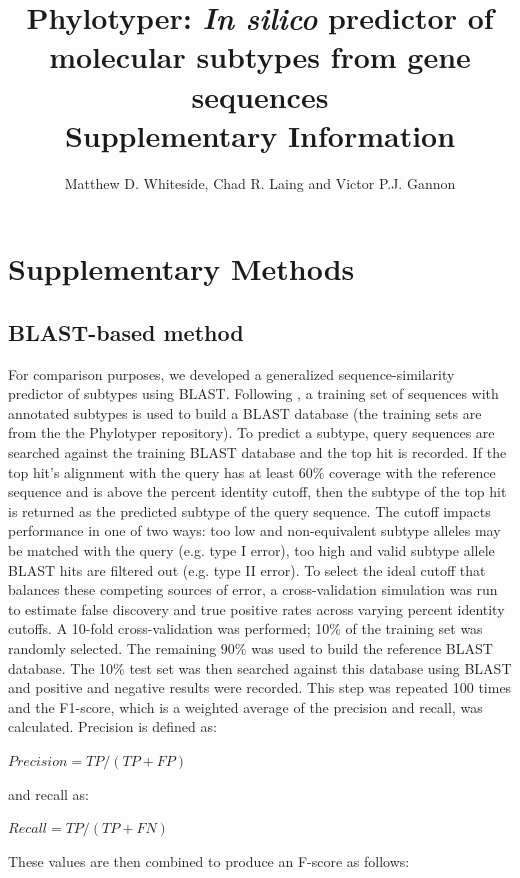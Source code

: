 \documentclass[11pt,letterpaper]{article}
\title{Phylotyper: {\it In silico} predictor of molecular subtypes from gene sequences \\ \large Supplementary Information}
\author{Matthew D. Whiteside, Chad R. Laing and Victor P.J. Gannon}
\date{ }
\begin{document}
 
 
\tableofcontents

\clearpage

\section{Supplementary Methods}


\subsection{BLAST-based method}

For comparison purposes, we developed a generalized sequence-similarity predictor of subtypes using BLAST. Following \citep{Jenkins2015}, a training set of sequences with annotated subtypes is used to build a BLAST database (the training sets are from the the Phylotyper repository). To predict a subtype, query sequences are searched against the training BLAST database and the top hit is recorded. If the top hit's alignment with the query has at least 60\% coverage with the reference sequence and is above the percent identity cutoff, then the subtype of the top hit is returned as the predicted subtype of the query sequence. The cutoff impacts performance in one of two ways: too low and non-equivalent subtype alleles may be matched with the query (e.g. type I error), too high and valid subtype allele BLAST hits are filtered out (e.g. type II error). To select the ideal cutoff that balances these competing sources of error, a cross-validation simulation was run to estimate false discovery and true positive rates across varying percent identity cutoffs. A 10-fold cross-validation was performed; 10\% of the training set was randomly selected. The remaining 90\% was used to build the reference BLAST database. The 10\% test set was then searched against this database using BLAST and positive and negative results were recorded. This step was repeated 100 times and the F1-score, which is a weighted average of the precision and recall, was calculated. Precision is defined as: 

$Precision = TP / (TP + FP)$

and recall as:

$Recall = TP / (TP + FN)$

These values are then combined to produce an F-score as follows:
\end{document}
